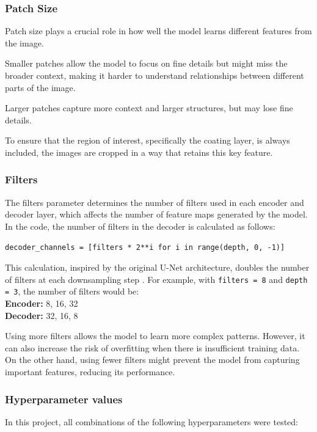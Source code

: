 \subsubsection{Patch Size}
Patch size plays a crucial role in how well the model learns different features from the image.

Smaller patches allow the model to focus on fine details but might miss the broader context, making it harder to understand relationships between different parts of the image.

Larger patches capture more context and larger structures, but may lose fine details.

To ensure that the region of interest, specifically the coating layer, is always included, the images are cropped in a way that retains this key feature.

\subsubsection{Filters}
The filters parameter determines the number of filters used in each encoder and decoder layer, which affects the number of feature maps generated by the model. In the code, the number of filters in the decoder is calculated as follows:

\begin{verbatim}
decoder_channels = [filters * 2**i for i in range(depth, 0, -1)]
\end{verbatim}

This calculation, inspired by the original U-Net architecture, doubles the number of filters at each downsampling step \cite{2018arXiv180906839B}. For example, with \texttt{filters = 8} and \texttt{depth = 3}, the number of filters would be:  
\\\textbf{Encoder:} 8, 16, 32 \\
\textbf{Decoder:} 32, 16, 8

Using more filters allows the model to learn more complex patterns. However, it can also increase the risk of overfitting when there is insufficient training data. On the other hand, using fewer filters might prevent the model from capturing important features, reducing its performance.
\subsubsection{Hyperparameter values}\label{sec:1.2.8}

In this project, all combinations of the following hyperparameters were tested:

